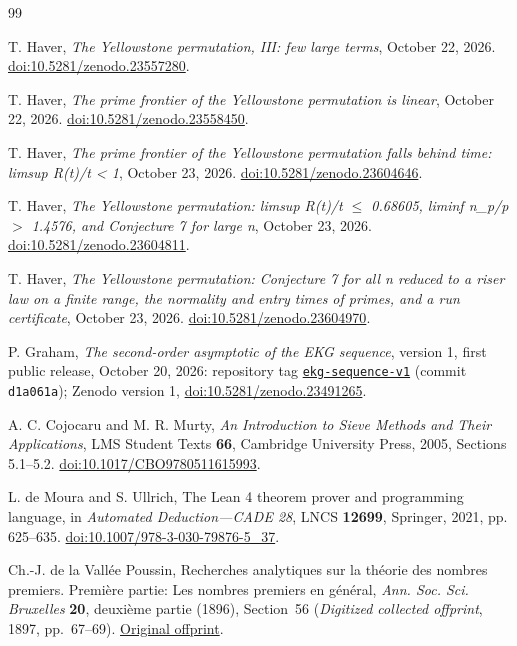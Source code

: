 \documentclass[11pt]{article}
\theoremstyle{remark}
\begin{document}
\begin{thebibliography}{99}

T. Haver, \emph{The Yellowstone permutation, III: few large terms}, October 22, 2026.
\href{https://doi.org/10.5281/zenodo.23557280}{doi:10.5281/zenodo.23557280}.

T. Haver, \emph{The prime frontier of the Yellowstone permutation is linear}, October 22, 2026.
\href{https://doi.org/10.5281/zenodo.23558450}{doi:10.5281/zenodo.23558450}.

T. Haver, \emph{The prime frontier of the Yellowstone permutation falls behind time: limsup R(t)/t < 1}, October 23, 2026.
\href{https://doi.org/10.5281/zenodo.23604646}{doi:10.5281/zenodo.23604646}.

T. Haver, \emph{The Yellowstone permutation: limsup R(t)/t $\leq$ 0.68605, liminf n\_p/p $>$ 1.4576, and Conjecture 7 for large n}, October 23, 2026.
\href{https://doi.org/10.5281/zenodo.23604811}{doi:10.5281/zenodo.23604811}.

T. Haver, \emph{The Yellowstone permutation: Conjecture 7 for all n reduced to a riser law on a finite range, the normality and entry times of primes, and a run certificate}, October 23, 2026.
\href{https://doi.org/10.5281/zenodo.23604970}{doi:10.5281/zenodo.23604970}.

P. Graham, \emph{The second-order asymptotic of the EKG sequence}, version 1,
first public release, October 20, 2026: repository tag
\href{https://github.com/6/clank-lab/tree/ekg-sequence-v1/results/ekg-sequence}{\texttt{ekg-sequence-v1}}
(commit \texttt{d1a061a});
Zenodo version 1, \href{https://doi.org/10.5281/zenodo.23491265}{doi:10.5281/zenodo.23491265}.


A. C. Cojocaru and M. R. Murty, \emph{An Introduction to Sieve Methods
and Their Applications}, LMS Student Texts \textbf{66}, Cambridge
University Press, 2005, Sections 5.1--5.2.
\href{https://doi.org/10.1017/CBO9780511615993}{doi:10.1017/CBO9780511615993}.

L. de Moura and S. Ullrich, The Lean 4 theorem prover and programming
language, in \emph{Automated Deduction---CADE 28}, LNCS \textbf{12699},
Springer, 2021, pp. 625--635.
\href{https://doi.org/10.1007/978-3-030-79876-5_37}{doi:10.1007/978-3-030-79876-5\_37}.

Ch.-J. de la Vall\'ee Poussin, Recherches analytiques sur la th\'eorie
des nombres premiers. Premi\`ere partie: Les nombres premiers en g\'en\'eral,
\emph{Ann. Soc. Sci. Bruxelles} \textbf{20}, deuxi\`eme partie (1896),
Section~56 (\emph{Digitized collected offprint}, 1897, pp.~67--69).
\href{https://archive.org/details/recherchesanaly00pousgoog}{Original offprint}.


\end{thebibliography}
\end{document}
